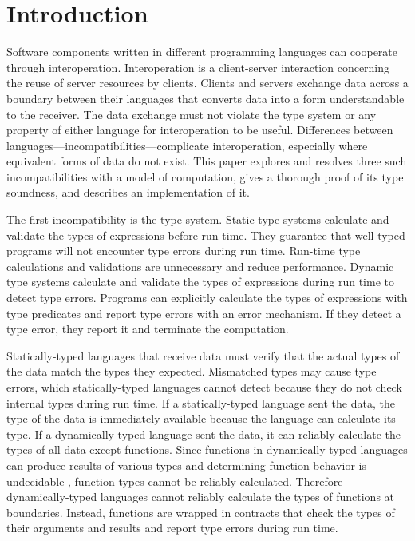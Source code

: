 \chapter{Introduction}

Software components written in different programming languages can cooperate through interoperation.  Interoperation is a client-server interaction concerning the reuse of server resources by clients.  Clients and servers exchange data across a boundary between their languages that converts data into a form understandable to the receiver.  The data exchange must not violate the type system or any property of either language for interoperation to be useful.  Differences between languages---incompatibilities---complicate interoperation, especially where equivalent forms of data do not exist.  This paper explores and resolves three such incompatibilities with a model of computation, gives a thorough proof of its type soundness, and describes an implementation of it.

The first incompatibility is the type system.  Static type systems calculate and validate the types of expressions before run time.  They guarantee that well-typed programs will not encounter type errors during run time.  Run-time type calculations and validations are unnecessary and reduce performance.  Dynamic type systems calculate and validate the types of expressions during run time to detect type errors.  Programs can explicitly calculate the types of expressions with type predicates and report type errors with an error mechanism.  If they detect a type error, they report it and terminate the computation.

Statically-typed languages that receive data must verify that the actual types of the data match the types they expected.  Mismatched types may cause type errors, which statically-typed languages cannot detect because they do not check internal types during run time.  If a statically-typed language sent the data, the type of the data is immediately available because the language can calculate its type.  If a dynamically-typed language sent the data, it can reliably calculate the types of all data except functions.  Since functions in dynamically-typed languages can produce results of various types and determining function behavior is undecidable \cite{blume04}, function types cannot be reliably calculated.  Therefore dynamically-typed languages cannot reliably calculate the types of functions at boundaries.  Instead, functions are wrapped in contracts \cite{findler02} that check the types of their arguments and results and report type errors during run time.


